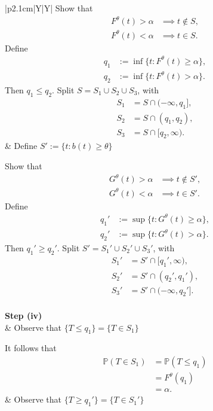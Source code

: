 \begin{table}[H]
\begin{center}
\begin{tabularx}{\textwidth}{|p{2.1cm}|Y|Y|}
			Show that
			\[
			\begin{aligned}
				F^\theta(t)>\alpha &\implies t\notin S,\\
				F^\theta(t)<\alpha &\implies t\in S.
			\end{aligned}
			\]
			Define
			\[
			\begin{aligned}
				q_1&:=\inf\{t:F^\theta(t)\geq\alpha\},\\
				q_2&:=\inf\{t:F^\theta(t)>\alpha\}.
			\end{aligned}
			\]
			Then $q_1\leq q_2$.
			Split $S=S_1\cup S_2\cup S_3$, with
			\[
			\begin{aligned}
				S_1&=S\cap(-\infty,q_1],\\
				S_2&=S\cap(q_1,q_2),\\
				S_3&=S\cap[q_2,\infty).
			\end{aligned}
			\]
			&
			Define
			$S':=\{t:b(t)\geq \theta\}$
			
			Show that
			\[
			\begin{aligned}
				G^\theta(t)>\alpha &\implies t\notin S',\\
				G^\theta(t)<\alpha &\implies t\in S'.
			\end{aligned}
			\]
			Define
			\[
			\begin{aligned}
				q_1'&:=\sup\{t:G^\theta(t)\geq\alpha\},\\
				q_2'&:=\sup\{t:G^\theta(t)>\alpha\}.
			\end{aligned}
			\]
			Then $q_1'\geq q_2'$.
			Split $S'=S_1'\cup S_2'\cup S_3'$, with
			\[
			\begin{aligned}
				S_1'&=S'\cap[q_1',\infty),\\
				S_2'&=S'\cap(q_2',q_1'),\\
				S_3'&=S'\cap(-\infty,q_2'].
			\end{aligned}
			\]
			\\
			\hline
			\textbf{Step (iv)}
			\\[-2mm]
			&
			Observe that $\{T\leq q_1\}=\{T\in S_1\}$
			
			It follows that
			\[
			\begin{aligned}
				\mathbb{P}(T\in S_1)
				&=\mathbb{P}(T\leq q_1)\\
				&=F^\theta(q_1)\\
				&=\alpha.
			\end{aligned}
			\]
			&
			Observe that $\{T\geq q_1'\}=\{T\in S_1'\}$
			

\end{tabularx}
\end{center}
\end{table}
